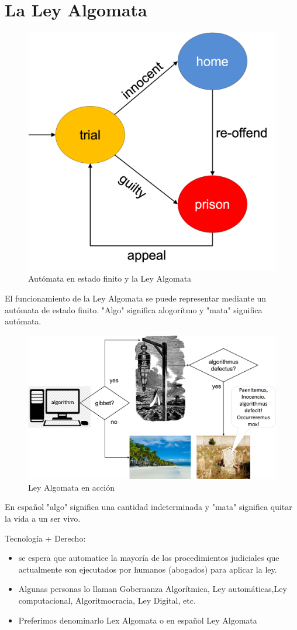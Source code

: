 \documentclass[12pt]{report} %
\begin{document}
\section{La Ley Algomata}


\begin{figure}
\centering
\includegraphics[width=0.55\columnwidth]{figures/Leyalgomata_finitestateautonoma.png}
\caption{ Autómata en estado finito y la Ley Algomata}
\label{dosflechas}
\end{figure} 

El funcionamiento de la Ley Algomata se puede representar mediante un autómata de estado finito.
"Algo" significa alogorítmo y "mata" significa autómata.


\begin{figure}
\centering
\includegraphics[width=0.55\columnwidth]{figures/Leyalgomata_gibbet.png}
\caption{ Ley Algomata en acción}
\label{dosflechas}
\end{figure} 

En español "algo" significa una cantidad indeterminada y "mata" significa quitar la vida a un ser vivo.

Tecnología + Derecho:

\begin{itemize}
    \item se espera que automatice la mayoría de los procedimientos judiciales que actualmente son ejecutados por humanos (abogados) para aplicar la ley.
    
    \item Algunas personas lo llaman Gobernanza Algorítmica, Ley automáticas,Ley computacional, Algoritmocracia, Ley Digital, etc. 
    
    \item Preferimos denominarlo Lex Algomata o en español Ley Algomata
    
\end{itemize}
\end{document}
